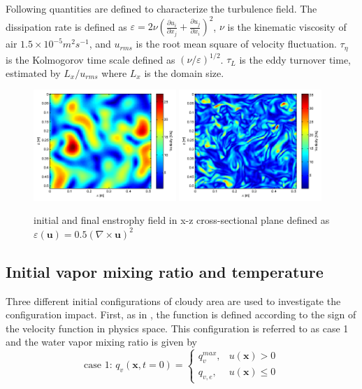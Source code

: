 \documentclass[draft,jgrga]{AGUTeX}
\begin{document}
\begin{article}
Following quantities are defined to characterize the turbulence field. 
The dissipation rate is defined as $\varepsilon=2\nu(\frac{\partial u_{i}}{\partial x_{j}}+\frac{\partial u_{j}}{\partial x_{i}})^{2}$,
$\nu$ is the kinematic viscosity of air $1.5\times10^{-5}m^{2}s^{-1}$, and $u_{rms}$
is the root mean square of velocity fluctuation. $\tau_{\eta}$ is
the Kolmogorov time scale defined as $(\nu/\varepsilon)^{1/2}$. $\tau_L$
is the eddy turnover time, estimated by $L_x/u_{rms}$
where $L_x$ is the domain size.

\begin{figure}[H]
\includegraphics[width=0.48\textwidth]{Figures/vortex-0}
\includegraphics[width=0.48\textwidth]{Figures/vortex-1}

\caption{initial and final enstrophy field in x-z cross-sectional
plane defined as $\varepsilon(\mathbf{u}) = 0.5(\nabla\times\mathbf{u})^2$\label{fig:enstrophy}}
\end{figure}

\subsection{Initial vapor mixing ratio and temperature}
Three different initial configurations of cloudy area are used to investigate the configuration impact. First, as in \cite{And04}, the function is defined according to the sign of the velocity function in physics space. This configuration is referred to as case 1 and the water vapor mixing ratio is given by
\begin{equation}
\mbox{case 1: } q_v(\mathbf{x},t=0) = 
\left\{\begin{array}{lr}
q_v^{max}, & u(\mathbf{x}) > 0\\
q_{v,e}, & u(\mathbf{x}) \le 0
\end{array}\right.\label{case1}
\end{equation}


\end{article}
\end{document}
